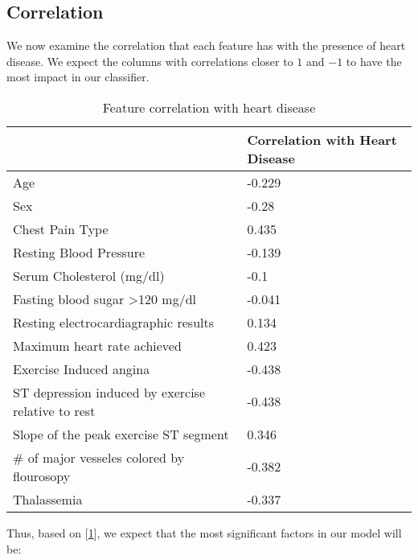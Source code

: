 \documentclass[letter]{article}
\begin{document}
\subsection{Correlation}
We now examine the correlation that each feature has with the presence of heart disease.  We expect the columns with correlations 
closer to \(1\) and \(-1\) to have the most impact in our classifier.  
\begin{table}[]
	\centering
	\begin{tabular}{@{}|l|l|@{}}
		\toprule
		& Correlation with Heart Disease \\ \midrule
		Age                                                & -0.229                         \\
		Sex                                                & -0.28                          \\
		Chest Pain Type                                    & 0.435                          \\
		Resting Blood Pressure                             & -0.139                         \\
		Serum Cholesterol (mg/dl)                          & -0.1                           \\
		Fasting blood sugar \textgreater 120 mg/dl         & -0.041                         \\
		Resting electrocardiagraphic results               & 0.134                          \\
		Maximum heart rate achieved                        & 0.423                          \\
		Exercise Induced angina                            & -0.438                         \\
		ST depression induced by exercise relative to rest & -0.438                         \\
		Slope of the peak exercise ST segment              & 0.346                          \\
		\# of major vesseles colored by flourosopy         & -0.382                         \\
		Thalassemia                                        & -0.337                         \\ \bottomrule
	\end{tabular}
	\caption{Feature correlation with heart disease}
	\label{tab:correlation}
\end{table}
Thus, based on [\ref{tab:correlation}], we expect that the most significant factors in our model will be:
\end{document}
